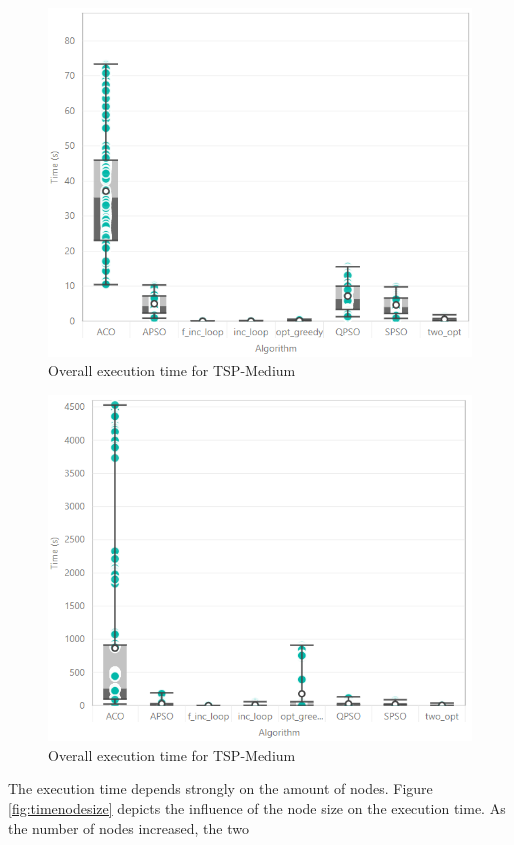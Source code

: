 \documentclass[conference]{IEEEtran}
\begin{document}
	 \begin{figure}[H]
    		\centering
    		\includegraphics[width=\columnwidth]{boxplot_time_M.png}
    		\caption{Overall execution time for TSP-Medium}
    		\label{fig:timenodesize_m}
	 \end{figure}
	 \begin{figure}[H]
    		\centering
    		\includegraphics[width=\columnwidth]{boxplot_time_BIG.png}
    		\caption{Overall execution time for TSP-Medium}
    		\label{fig:timenodesize_big}
	 \end{figure}
   The execution time depends strongly on the amount of nodes. Figure \ref{fig:timenodesize} depicts the influence of the node size on the execution time. As the number of nodes increased, the two
\end{document}
